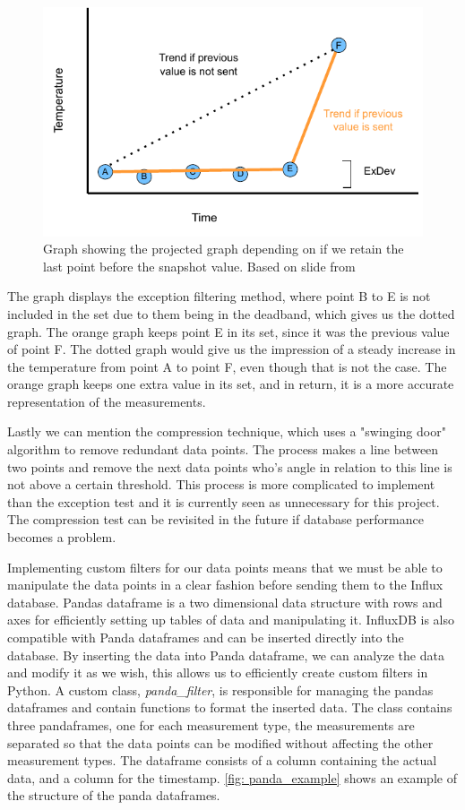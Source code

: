 \documentclass[main.tex]{subfiles}
\begin{document}
\begin{figure}[!htpb]
    \centering
    \includegraphics[width=12cm, scale=4]{images/exception_process_2.pdf}
    \caption{Graph showing the projected graph depending on if we retain the last point before the snapshot value. Based on slide from\cite{osisoft_exception}}
    \label{fig: osisoft_last_point}
\end{figure}
\FloatBarrier 
 
The graph displays the exception filtering method, where point B to E is not included in the set due to them being in the deadband, which gives us the dotted graph. The orange graph keeps point E in its set, since it was the previous value of point F. The dotted graph would give us the impression of a steady increase in the temperature from point A to point F, even though that is not the case. The orange graph keeps one extra value in its set, and in return, it is a more accurate representation of the measurements.
 
 Lastly we can mention the compression technique, which uses a "swinging door" algorithm to remove redundant data points. The process makes a line between two points and remove the next data points who's angle in relation to this line is not above a certain threshold. This process is more complicated to implement than the exception test and it is currently seen as unnecessary for this project. The compression test can be revisited in the future if database performance becomes a problem.
 
 Implementing custom filters for our data points means that we must be able to manipulate the data points in a clear fashion before sending them to the Influx database. Pandas dataframe is a two dimensional data structure with rows and axes for efficiently setting up tables of data and manipulating it. InfluxDB is also compatible with Panda dataframes and can be inserted directly into the database. By inserting the data into Panda dataframe, we can analyze the data and modify it as we wish, this allows us to efficiently create custom filters in Python. A custom class, \textit{panda\_filter}, is responsible for managing the pandas dataframes and contain functions to format the inserted data. The class contains three pandaframes, one for each measurement type, the measurements are separated so that the data points can be modified without affecting the other measurement types. The dataframe consists of a column containing the actual data, and a column for the timestamp. \autoref{fig: panda_example} shows an example of the structure of the panda dataframes. 
 
\end{document}
